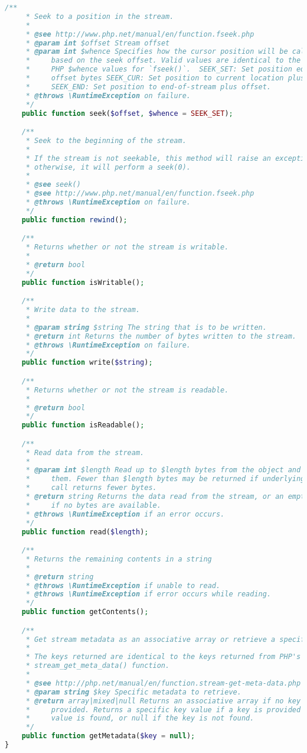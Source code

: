 \begin{lstlisting}[language=PHP]
    /**
     * Seek to a position in the stream.
     *
     * @see http://www.php.net/manual/en/function.fseek.php
     * @param int $offset Stream offset
     * @param int $whence Specifies how the cursor position will be calculated
     *     based on the seek offset. Valid values are identical to the built-in
     *     PHP $whence values for `fseek()`.  SEEK_SET: Set position equal to
     *     offset bytes SEEK_CUR: Set position to current location plus offset
     *     SEEK_END: Set position to end-of-stream plus offset.
     * @throws \RuntimeException on failure.
     */
    public function seek($offset, $whence = SEEK_SET);

    /**
     * Seek to the beginning of the stream.
     *
     * If the stream is not seekable, this method will raise an exception;
     * otherwise, it will perform a seek(0).
     *
     * @see seek()
     * @see http://www.php.net/manual/en/function.fseek.php
     * @throws \RuntimeException on failure.
     */
    public function rewind();

    /**
     * Returns whether or not the stream is writable.
     *
     * @return bool
     */
    public function isWritable();

    /**
     * Write data to the stream.
     *
     * @param string $string The string that is to be written.
     * @return int Returns the number of bytes written to the stream.
     * @throws \RuntimeException on failure.
     */
    public function write($string);

    /**
     * Returns whether or not the stream is readable.
     *
     * @return bool
     */
    public function isReadable();

    /**
     * Read data from the stream.
     *
     * @param int $length Read up to $length bytes from the object and return
     *     them. Fewer than $length bytes may be returned if underlying stream
     *     call returns fewer bytes.
     * @return string Returns the data read from the stream, or an empty string
     *     if no bytes are available.
     * @throws \RuntimeException if an error occurs.
     */
    public function read($length);

    /**
     * Returns the remaining contents in a string
     *
     * @return string
     * @throws \RuntimeException if unable to read.
     * @throws \RuntimeException if error occurs while reading.
     */
    public function getContents();

    /**
     * Get stream metadata as an associative array or retrieve a specific key.
     *
     * The keys returned are identical to the keys returned from PHP's
     * stream_get_meta_data() function.
     *
     * @see http://php.net/manual/en/function.stream-get-meta-data.php
     * @param string $key Specific metadata to retrieve.
     * @return array|mixed|null Returns an associative array if no key is
     *     provided. Returns a specific key value if a key is provided and the
     *     value is found, or null if the key is not found.
     */
    public function getMetadata($key = null);
}
\end{lstlisting}

